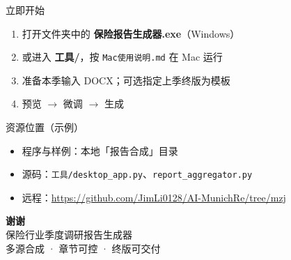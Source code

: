 \documentclass[aspectratio=169,10pt,UTF8]{ctexbeamer}
\begin{document}
\begin{frame}{立即开始}
  \begin{enumerate}
    \item 打开文件夹中的 \textbf{保险报告生成器.exe}（Windows）
    \item 或进入 \textbf{工具/}，按 \texttt{Mac使用说明.md} 在 Mac 运行
    \item 准备本季输入 DOCX；可选指定上季终版为模板
    \item 预览 $\rightarrow$ 微调 $\rightarrow$ 生成
  \end{enumerate}
  \vspace{0.9em}
  \begin{block}{资源位置（示例）}
    \small
    \begin{itemize}
      \item 程序与样例：本地「报告合成」目录
      \item 源码：\texttt{工具/desktop\_app.py}、\texttt{report\_aggregator.py}
      \item 远程：\url{https://github.com/JimLi0128/AI-MunichRe/tree/mzj}
    \end{itemize}
  \end{block}
\end{frame}

\begin{frame}[plain]
  \vfill
  \begin{center}
    {\color{BrandBlue}\Huge\bfseries 谢谢}\\[0.8em]
    {\Large 保险行业季度调研报告生成器}\\[0.5em]
    {\large 多源合成 · 章节可控 · 终版可交付}\\[1.4em]
  \end{center}
  \vfill
\end{frame}
\end{document}
